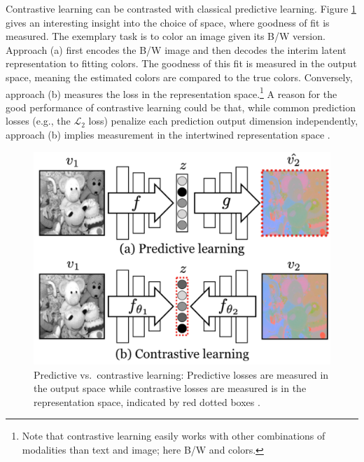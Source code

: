 \documentclass[
]{krantz}
\begin{document}
Contrastive learning can be contrasted with classical predictive learning.
Figure \ref{fig:contr-vs-pred-learn} gives an interesting insight into the choice of space, where goodness of fit is measured.
The exemplary task is to color an image given its B/W version.
Approach (a) first encodes the B/W image and then decodes the interim latent representation to fitting colors.
The goodness of this fit is measured in the output space, meaning the estimated colors are compared to the true colors.
Conversely, approach (b) measures the loss in the representation space.\footnote{Note that contrastive learning easily works with other combinations of modalities than text and image; here B/W and colors.}
A reason for the good performance of contrastive learning could be that, while common prediction losses (e.g., the \(\mathcal{L}_2\) loss) penalize each prediction output dimension independently, approach (b) implies measurement in the intertwined representation space \citep{tian2020contrastive}.

\begin{figure}

{\centering \includegraphics[width=1\linewidth]{figures/02-04-text-support-img/tian-predictive-vs-contrastive} 

}

\caption{Predictive vs.~contrastive learning: Predictive losses are measured in the output space while contrastive losses are measured is in the representation space, indicated by red dotted boxes \citep{tian2020contrastive}.}\label{fig:contr-vs-pred-learn}
\end{figure}
\end{document}
